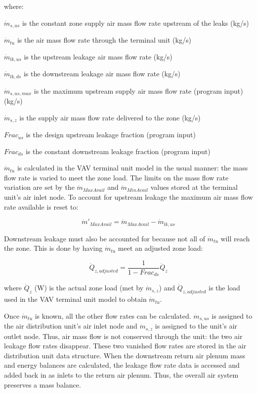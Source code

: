 where:

\({\dot m_{s,us}}\) is the constant zone supply air mass flow rate upstream of the leaks (kg/s)

\({\dot m_{tu}}\) is the air mass flow rate through the terminal unit (kg/s)

\({\dot m_{lk,us}}\) is the upstream leakage air mass flow rate (kg/s)

\({\dot m_{lk,ds}}\) is the downstream leakage air mass flow rate (kg/s)

\({\dot m_{s,us,max}}\) is the maximum upstream supply air mass flow rate (program input) (kg/s)

\({\dot m_{s,z}}\) is the supply air mass flow rate delivered to the zone (kg/s)

\(Fra{c_{us}}\) is the design upstream leakage fraction (program input)

\(Fra{c_{ds}}\) is the constant downstream leakage fraction (program input)

\({\dot m_{tu}}\) is calculated in the VAV terminal unit model in the usual manner: the mass flow rate is varied to meet the zone load. The limits on the mass flow rate variation are set by the \({\dot m_{MaxAvail}}\) and \({\dot m_{MinAvail}}\) values stored at the terminal unit's air inlet node. To account for upstream leakage the maximum air mass flow rate available is reset to:

\begin{equation}
{\dot m'_{MaxAvail}} = {\dot m_{MaxAvail}} - {\dot m_{lk,us}}
\end{equation}

Downstream leakage must also be accounted for because not all of \({\dot m_{tu}}\) will reach the zone. This is done by having \({\dot m_{tu}}\) meet an adjusted zone load:

\begin{equation}
{\dot Q_{z,adjusted}} = \frac{1}{{1 - Fra{c_{ds}}}}{\dot Q_z}
\end{equation}

where \({\dot Q_z}\) (W) is the actual zone load (met by \({\dot m_{s,z}}\)) and \({\dot Q_{z,adjusted}}\) is the load used in the VAV terminal unit model to obtain \({\dot m_{tu}}\).

Once \({\dot m_{tu}}\) is known, all the other flow rates can be calculated. \({\dot m_{s,us}}\) is assigned to the air distribution unit's air inlet node and \({\dot m_{s,z}}\) is assigned to the unit's air outlet node. Thus, air mass flow is not conserved through the unit: the two air leakage flow rates disappear. These two vanished flow rates are stored in the air distribution unit data structure. When the downstream return air plenum mass and energy balances are calculated, the leakage flow rate data is accessed and added back in as inlets to the return air plenum. Thus, the overall air system preserves a mass balance.

